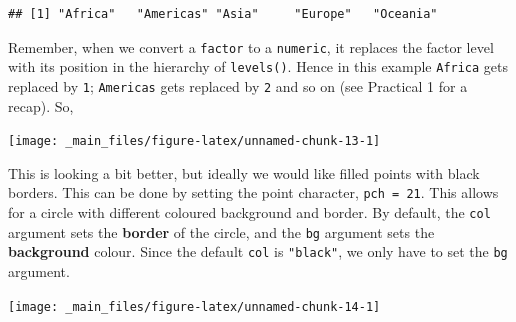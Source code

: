 \documentclass[]{book}
\newenvironment{Shaded}{\begin{snugshade}}{\end{snugshade}}
\newcommand{\KeywordTok}[1]{\textcolor[rgb]{0.13,0.29,0.53}{\textbf{{#1}}}}
\newcommand{\DataTypeTok}[1]{\textcolor[rgb]{0.13,0.29,0.53}{{#1}}}
\newcommand{\DecValTok}[1]{\textcolor[rgb]{0.00,0.00,0.81}{{#1}}}
\newcommand{\NormalTok}[1]{{#1}}
\theoremstyle{definition}
\theoremstyle{definition}
\theoremstyle{definition}
\theoremstyle{remark}
\begin{document}
\begin{Shaded}
\end{Shaded}

\begin{verbatim}
## [1] "Africa"   "Americas" "Asia"     "Europe"   "Oceania"
\end{verbatim}

Remember, when we convert a \texttt{factor} to a \texttt{numeric}, it
replaces the factor level with its position in the hierarchy of
\texttt{levels()}. Hence in this example \texttt{Africa} gets replaced
by \texttt{1}; \texttt{Americas} gets replaced by \texttt{2} and so on
(see Practical 1 for a recap). So,

\begin{Shaded}
\end{Shaded}

\begin{center}\texttt{[image: \_main\_files/figure-latex/unnamed-chunk-13-1]} \end{center}

This is looking a bit better, but ideally we would like filled points
with black borders. This can be done by setting the point character,
\texttt{pch\ =\ 21}. This allows for a circle with different coloured
background and border. By default, the \texttt{col} argument sets the
\textbf{border} of the circle, and the \texttt{bg} argument sets the
\textbf{background} colour. Since the default \texttt{col} is
\texttt{"black"}, we only have to set the \texttt{bg} argument.

\begin{Shaded}
\end{Shaded}

\begin{center}\texttt{[image: \_main\_files/figure-latex/unnamed-chunk-14-1]} \end{center}
\end{document}
